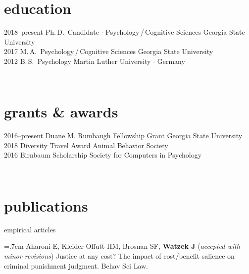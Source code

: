 \documentclass[]{friggeri-cv}
\begin{document}
\section{education}

\begin{entrylist}
  \entry
    {2018--present}
    {Ph.\,D.~Candidate $\cdot$ Psychology\,/\,Cognitive Sciences}
    {Georgia State University}
    {\\[-.7cm]}
 \entry
   {2017}
   {M.\,A.~Psychology\,/\,Cognitive Sciences}
   {Georgia State University}
   {\\[-.7cm]}
  \entry
    {2012}
    {B.\,S.~Psychology}
    {Martin Luther University $\cdot$ Germany}
    {}
\end{entrylist}\\[-.1cm]


\section{grants \& awards}

\begin{entrylist}
  \entry
    {2016--present}
    {Duane M. Rumbaugh Fellowship Grant}
    {Georgia State University}
    {\\[-.75cm]}
  \entry
    {2018}
    {Diversity Travel Award}
    {Animal Behavior Society}
    {\\[-.75cm]}
  \entry
    {2016}
    {Birnbaum Scholarship}
    {Society for Computers in Psychology}
    {}
\end{entrylist}\\[-.1cm]


\section{publications}


{\subfont\large{} empirical articles}

\hangindent=.7cm Aharoni E, Kleider-Offutt HM, Brosnan SF, \textbf{Watzek J} (\emph{accepted with minor revisions}) Justice at any cost? The impact of cost/benefit salience on criminal punishment judgment. Behav Sci Law.
\end{document}
